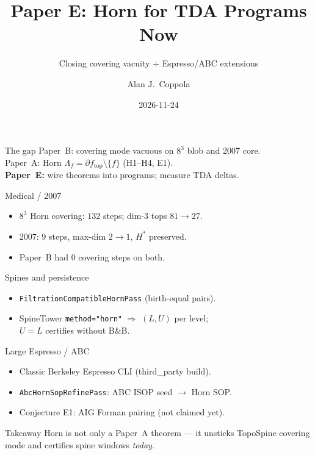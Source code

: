 \documentclass[aspectratio=169,11pt]{beamer}
\title{Paper E: Horn for TDA Programs Now}
\subtitle{Closing covering vacuity + Espresso/ABC extensions}
\author{Alan J.\ Coppola}
\date{2026-11-24}
\begin{document}
\begin{frame}\titlepage\end{frame}

\begin{frame}{The gap}
Paper~B: covering mode vacuous on $8^3$ blob and 2007 core.\\[0.5em]
Paper~A: Horn $\Lambda_f=\partial f_{\mathrm{top}}\setminus\{f\}$ (H1--H4, E1).\\[0.5em]
\textbf{Paper~E:} wire theorems into programs; measure TDA deltas.
\end{frame}

\begin{frame}{Medical / 2007}
\begin{itemize}
\item $8^3$ Horn covering: $132$ steps; dim-$3$ tops $81\to 27$.
\item 2007: $9$ steps, max-dim $2\to 1$, $H^*$ preserved.
\item Paper~B had $0$ covering steps on both.
\end{itemize}
\end{frame}

\begin{frame}{Spines and persistence}
\begin{itemize}
\item \texttt{FiltrationCompatibleHornPass} (birth-equal pairs).
\item SpineTower \texttt{method="horn"} $\Rightarrow$ $(L,U)$ per level;\\
$U=L$ certifies without B\&B.
\end{itemize}
\end{frame}

\begin{frame}{Large Espresso / ABC}
\begin{itemize}
\item Classic Berkeley Espresso CLI (third\_party build).
\item \texttt{AbcHornSopRefinePass}: ABC ISOP seed $\to$ Horn SOP.
\item Conjecture E1: AIG Forman pairing (not claimed yet).
\end{itemize}
\end{frame}

\begin{frame}{Takeaway}
Horn is not only a Paper~A theorem --- it unsticks TopoSpine covering
mode and certifies spine windows \emph{today}.
\end{frame}
\end{document}
